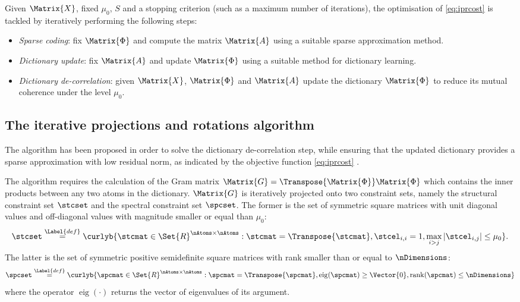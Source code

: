 \documentclass{article}
\def \Feas{\Matrix{X}} 	%
\def \Dic{\Matrix{\Phi}} %
\def \Coeff{\Matrix{A}} 	%
\def \coherence{\mu} 		%
\def \nActiveAtoms{S} 	%
\def \definition{\overset{\Label{def}}{=}}	%
\def \Gram{\Matrix{G}} 						%
\def \ambient{\Set{R}} 						%
\begin{document}
Given $\Feas$, fixed $\coherence_{0}$, $\nActiveAtoms$ and a stopping criterion (such as a maximum number of iterations), the optimisation of \eqref{eq:iprcost} is tackled by iteratively performing the following steps:
\begin{itemize}
	\item\emph{Sparse coding}: fix $\Dic$ and compute the matrix $\Coeff$ using a suitable sparse approximation method.
	\item\emph{Dictionary update}: fix $\Coeff$ and update $\Dic$ using a suitable method for dictionary learning.
	\item\emph{Dictionary de-correlation}: given $\Feas$, $\Dic$ and $\Coeff$ update the dictionary $\Dic$ to reduce its mutual coherence under the level $\coherence_{0}$.
\end{itemize}

\subsection{The iterative projections and rotations algorithm}\label{sec:ipr}
The  algorithm has been proposed in order to solve the dictionary de-correlation step, while ensuring that the updated dictionary provides a sparse approximation with low residual norm, as indicated by the objective function \eqref{eq:iprcost} \cite{Barchiesi2013Le}.

The  algorithm requires the calculation of the Gram matrix $\Gram=\Transpose{\Dic}\Dic$ which contains the inner products between any two atoms in the dictionary. $\Gram$ is iteratively projected onto two constraint sets, namely the structural constraint set $\stcset$ and the spectral constraint set $\spcset$. The former is the set of symmetric square matrices with unit diagonal values and off-diagonal values with magnitude smaller or equal than $\coherence_{0}$:
\small
\begin{equation*}
	\stcset \definition \curlyb{\stcmat \in \ambient^{\nAtoms \times \nAtoms} : \stcmat = \Transpose{\stcmat}, \stcel_{i,i}=1,\max_{i > j}|\stcel_{i,j}|\leq \coherence_{0}}.
\end{equation*}
\normalsize
The latter is the set of symmetric positive semidefinite square matrices with rank smaller than or equal to $\nDimensions$:
\begin{equation*}
\spcset \definition \curlyb{ \spcmat \in \ambient^{\nAtoms \times \nAtoms} : \spcmat = \Transpose{\spcmat}, \operatorname{eig}(\spcmat)\geq \Vector{0}, \operatorname{rank}(\spcmat)\leq \nDimensions}
\end{equation*}  
where the operator $\operatorname{eig}(\cdot)$ returns the vector of eigenvalues of its argument.
\end{document}
